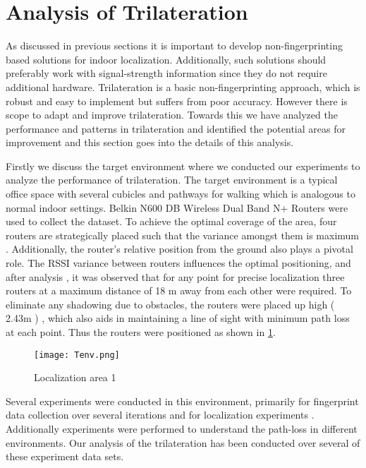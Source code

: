 \section{Analysis of Trilateration}


As discussed in previous sections it is important to develop non-fingerprinting based solutions for indoor localization. Additionally, such solutions should preferably work with signal-strength information since they do not require additional hardware. Trilateration is a basic non-fingerprinting approach, which is robust and easy to implement but suffers from poor accuracy. However there is scope to adapt and improve trilateration. Towards this we have analyzed the performance and patterns in trilateration and identified the potential areas for improvement and this section goes into the details of this analysis. 

Firstly we discuss the target environment where we conducted our experiments to analyze the performance of trilateration. The target environment is a typical office space with several cubicles and pathways for walking which is analogous to normal indoor settings. Belkin N600 DB Wireless Dual Band N+ Routers were used to collect the dataset. To achieve the optimal coverage of the area, four routers are strategically placed such that the variance amongst them is maximum \cite{kaemarungsi2012analysis , CiscoLocation}. Additionally, the router's relative position from the ground also plays a pivotal role. The RSSI variance between routers influences the optimal positioning, and after analysis \cite{shanmugaapriyan2014pragmatic} , it was observed that for any point for precise localization  three routers at a maximum distance of 18 m away from each other were required. To eliminate any shadowing due to obstacles, the routers were placed up high ( 2.43m ) \cite{shanmugaapriyan2014pragmatic}, which also aids in maintaining a line of sight with minimum path loss at each point. Thus the routers were positioned as shown in \ref{fig:tenv}.

\begin{figure}[h]
\centering
\texttt{[image: Tenv.png]}
\caption{ Localization area 1 }
\label{fig:tenv}
\end{figure}

Several experiments were conducted in this environment, primarily for fingerprint data collection over several iterations and for localization experiments \cite{shanmugaapriyan2014pragmatic}. Additionally experiments were performed to understand the path-loss in different environments. Our analysis of the trilateration has been conducted over several of these experiment data sets.

